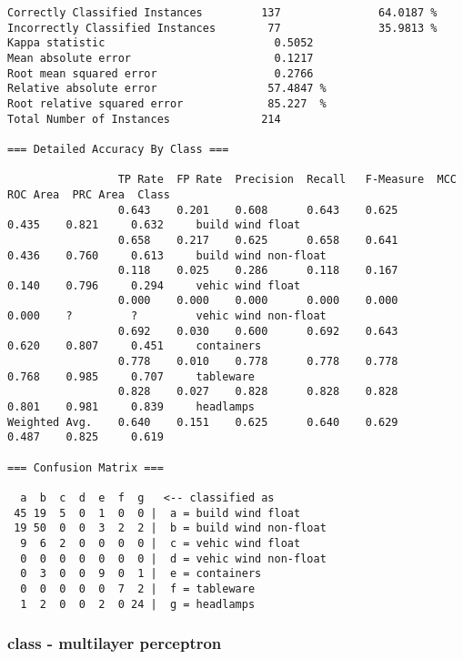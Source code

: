\documentclass[a4paper]{article}
\begin{document}
\begin{verbatim}
Correctly Classified Instances         137               64.0187 %
Incorrectly Classified Instances        77               35.9813 %
Kappa statistic                          0.5052
Mean absolute error                      0.1217
Root mean squared error                  0.2766
Relative absolute error                 57.4847 %
Root relative squared error             85.227  %
Total Number of Instances              214

=== Detailed Accuracy By Class ===

                 TP Rate  FP Rate  Precision  Recall   F-Measure  MCC      ROC Area  PRC Area  Class
                 0.643    0.201    0.608      0.643    0.625      0.435    0.821     0.632     build wind float
                 0.658    0.217    0.625      0.658    0.641      0.436    0.760     0.613     build wind non-float
                 0.118    0.025    0.286      0.118    0.167      0.140    0.796     0.294     vehic wind float
                 0.000    0.000    0.000      0.000    0.000      0.000    ?         ?         vehic wind non-float
                 0.692    0.030    0.600      0.692    0.643      0.620    0.807     0.451     containers
                 0.778    0.010    0.778      0.778    0.778      0.768    0.985     0.707     tableware
                 0.828    0.027    0.828      0.828    0.828      0.801    0.981     0.839     headlamps
Weighted Avg.    0.640    0.151    0.625      0.640    0.629      0.487    0.825     0.619

=== Confusion Matrix ===

  a  b  c  d  e  f  g   <-- classified as
 45 19  5  0  1  0  0 |  a = build wind float
 19 50  0  0  3  2  2 |  b = build wind non-float
  9  6  2  0  0  0  0 |  c = vehic wind float
  0  0  0  0  0  0  0 |  d = vehic wind non-float
  0  3  0  0  9  0  1 |  e = containers
  0  0  0  0  0  7  2 |  f = tableware
  1  2  0  0  2  0 24 |  g = headlamps

\end{verbatim}


\subsubsection{class - multilayer perceptron}
\end{document}
